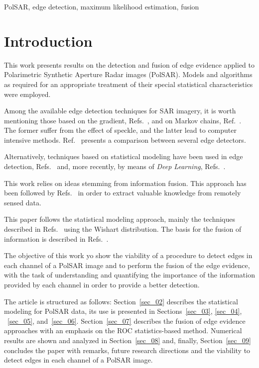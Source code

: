 \documentclass[conference]{IEEEtran}
\begin{document}
\begin{IEEEkeywords}
PolSAR, edge detection, maximum likelihood estimation, fusion
\end{IEEEkeywords}

\section{Introduction}\label{sec_01}

This work presents results on the detection and fusion of edge evidence applied to Polarimetric Synthetic Aperture Radar images (PolSAR). Models and algorithms as required for an appropriate treatment of their special statistical characteristics were employed.

Among the available edge detection techniques for SAR imagery, it is worth mentioning those based on the gradient, Refs.~\cite{tlb, obw, flmc, fyf}, and on Markov chains, Ref.~\cite{bf}. The former suffer from the effect of speckle, and the latter lead to computer intensive methods. Ref.~\cite{gfn} presents a comparison between several edge detectors. 

Alternatively, techniques based on statistical modeling have been used in edge detection, Refs.~\cite{gmbf, fbgm, horrit, gfn} and, more recently, by means of \textit{Deep Learning}, Refs.~\cite{bac, ztmxzxf, tabmm, xstz}.

This work relies on ideas stemming from information fusion.
This approach has been followed by Refs.~\cite{sglmla,sg} in order to extract valuable knowledge from remotely sensed data.

This paper follows the statistical modeling approach, mainly the techniques described in Refs.~\cite{fbgm, nhfc} using the Wishart distribution.
The basis for the fusion of information is described in Refs.~\cite{mit, sg}. 

The objective of this work yo show the viability of a procedure to detect edges in each channel of a PolSAR image and to perform the fusion of the edge evidence, with the task of understanding and quantifying the importance of the information provided by each channel in order to provide a better detection.

The article is structured as follows: 
Section~\ref{sec_02} describes the statistical modeling for PolSAR data, 
its use is presented in Sections~\ref{sec_03}, \ref{sec_04}, ~\ref{sec_05}, and~\ref{sec_06}.
Section~\ref{sec_07} describes the fusion of edge evidence approaches with an emphasis on the ROC statistics-based method.
Numerical results are shown and analyzed in Section~\ref{sec_08} and, finally, Section~\ref{sec_09} concludes the paper with remarks, future research directions and the viability  to detect edges in each channel of a PolSAR image.
\end{document}

